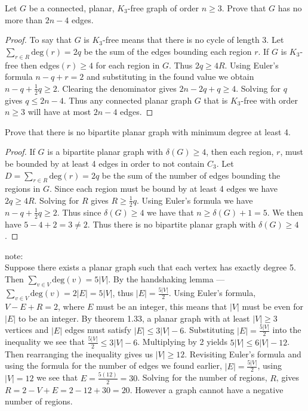 \documentclass{article}
\newenvironment{problem}[2][Problem]{\begin{trivlist}
\item[\hskip \labelsep {\bfseries #1}\hskip \labelsep {\bfseries #2.}]}{\end{trivlist}}
\begin{document}
\vspace{0.25cm}
\begin{problem}{6}Let $G$ be a connected, planar, $K_{3}$-free graph of order $n\geq3$. Prove that $G$ has no more than $2n-4$ edges.
    \begin{proof}
        To say that $G$ is $K_{3}$-free means that there is no cycle of length 3. Let $\sum_{r\in R}\text{deg}(r)=2q$ be the sum of the edges bounding each region $r$. If $G$ is $K_{3}$-free then edges$(r)\geq 4$ for each region in $G$. Thus $2q\geq 4R$. Using Euler's formula $n-q+r=2$ and substituting in the found value we obtain $n-q+\frac{1}{2}q\geq2$. Clearing the denominator gives $2n-2q+q\geq4$. Solving for $q$ gives $q\leq2n-4$. Thus any connected planar graph $G$ that is $K_{3}$-free with order $n\geq3$ will have at most $2n-4$ edges.
    \end{proof}
\end{problem}
\vspace{0.25cm}
\begin{problem}{7}Prove that there is no bipartite planar graph with minimum degree at least 4.
    \begin{proof}
        If $G$ is a bipartite planar graph with $\delta(G)\geq 4$, then each region, $r$, must be bounded by at least 4 edges in order to not contain $C_{3}$. Let $D=\sum_{r\in R}\text{deg}(r)=2q$ be the sum of the number of edges bounding the regions in $G$. Since each region must be bound by at least 4 edges we have $2q\geq4R$. Solving for $R$ gives $R\geq\frac{1}{2}q$. Using Euler's formula we have $n-q+\frac{1}{2}q\geq 2$. Thus since $\delta(G)\geq4$ we have that $n\geq\delta(G)+1=5$. We then have $5-4+2=3\neq2$. Thus there is no bipartite planar graph with $\delta(G)\geq 4$.

    \end{proof}
\end{problem}










\newpage
note:\\
Suppose there exists a planar graph such that each vertex has exactly degree 5. Then $\sum_{v\in V}\text{deg}(v)=5|V|$. By the handshaking lemma --- $\sum_{v\in V}\text{deg}(v)=2|E|=5|V|$, thus $|E|=\frac{5|V|}{2}$. Using Euler's formula, $V-E+R=2$, where $E$ must be an integer, this means that $|V|$ must be even for $|E|$ to be an integer. By theorem 1.33, a planar graph with at least $|V|\geq 3$ vertices and $|E|$ edges must satisfy $|E|\leq 3|V|-6$. Substituting $|E|=\frac{5|V|}{2}$ into the inequality we see that $\frac{5|V|}{2}\leq 3|V|-6$. Multiplying by 2 yields $5|V|\leq 6|V|-12$. Then rearranging the inequality gives us $|V|\geq 12$. Revisiting Euler's formula and using the formula for the number of edges we found earlier, $|E|=\frac{5|V|}{2}$, using $|V|=12$ we see that $E=\frac{5(12)}{2}=30$. Solving for the number of regions, $R$, gives $R=2-V+E=2-12+30=20$. However a graph cannot have a negative number of regions.
\end{document}
